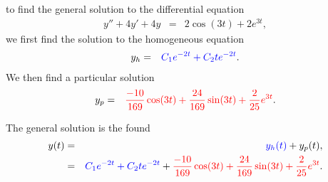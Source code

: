 \begin{frame}

  to find the general solution to the differential equation
  \begin{eqnarray*}
    y'' + 4y' + 4y & = & 2 \cos(3t) + 2e^{3t},
  \end{eqnarray*}
  we first find the solution to the homogeneous equation
  \begin{eqnarray*}
    y_h & = & {\color{blue}C_1 e^{-2t} + C_2 t e^{-2t}}.
  \end{eqnarray*}
  We then find a particular solution
  \begin{eqnarray*}
    y_p & = & {\color{red}\frac{-10}{169}\cos(3t) + \frac{24}{169} \sin(3t) + \frac{2}{25}  e^{3t}}.
  \end{eqnarray*}

  The general solution is the found
  \begin{eqnarray*}
    y(t) & = & {\color{blue}y_h(t)} + y_p(t), \\
         & = & {\color{blue}C_1 e^{-2t} + C_2 t e^{-2t}} + {\color{red}\frac{-10}{169}\cos(3t) +
               \frac{24}{169} \sin(3t) + \frac{2}{25}  e^{3t}}.
  \end{eqnarray*}

\end{frame}




